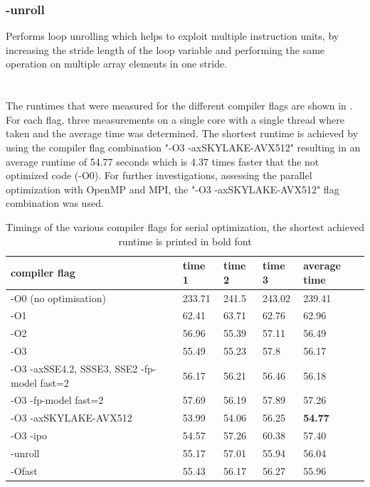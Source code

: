 \subsubsection*{-unroll}
Performs loop unrolling which helps to exploit multiple instruction units, by increasing the stride length of the loop variable and performing the same operation on multiple array elements in one stride. 
\\
\citep{anmeyRWTHHPCClusterUser, behrLectureParallelComputing, QuickReferenceGuide, IntelCompilerClassic2022}
\\
\\
The runtimes that were measured for the different compiler flags are shown in . For each flag, three measurements on a single core with a single thread where taken and the average time was determined. The shortest runtime is achieved by using the compiler flag combination "-O3 -axSKYLAKE-AVX512" resulting in an average runtime of 54.77 seconds which is 4.37 times faster that the not optimized code (-O0). For further investigations, assessing the parallel optimization with OpenMP and MPI, the "-O3 -axSKYLAKE-AVX512" flag combination was used.

\renewcommand{\arraystretch}{2}
\begin{table}[h!]
	\begin{center}
		\begin{tabular}{| p{5cm} | p{1.5cm} p{1.5cm} p{1.5cm} | p{1.5cm} | }
			\hline
			\hline
			compiler flag & time 1 & time 2 & time 3 & average time\\
			\hline
			-O0 (no optimisation) & 233.71	& 241.5	& 243.02 & 239.41 \\
			\hline
			-O1 & 62.41	& 63.71	& 62.76	& 62.96\\
			\hline
			-O2 & 56.96	& 55.39	& 57.11	& 56.49\\
			\hline 
			-O3 & 55.49	& 55.23	& 57.8	& 56.17\\
			\hline
			-O3 -axSSE4.2, SSSE3, SSE2 -fp-model fast=2 & 56.17	& 56.21	& 56.46	& 56.18\\
			\hline
			-O3 -fp-model fast=2 & 57.69 & 56.19 & 57.89 & 57.26\\
			\hline
			-O3 -axSKYLAKE-AVX512 & 53.99 & 54.06 & 56.25 & \textbf{54.77}\\
			\hline
			-O3 -ipo & 54.57 & 57.26 & 60.38 & 57.40\\
			\hline
			-unroll & 55.17	& 57.01	& 55.94	& 56.04\\
			\hline
			-Ofast & 55.43	& 56.17	& 56.27	& 55.96\\
			\hline
			\hline
		\end{tabular}
		\caption{\label{tab:SerialTimings}  Timings of the various compiler flags for serial optimization, the shortest achieved runtime is printed in bold font}
	\end{center}
\end{table}
\renewcommand{\arraystretch}{1}


